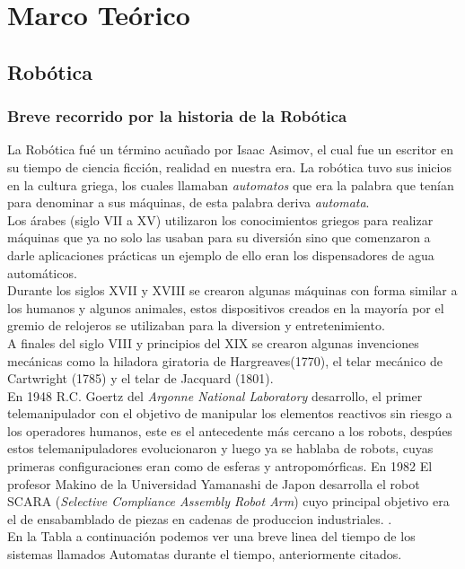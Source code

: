 
\chapter{Marco Te\'orico}
\section{Rob\'otica}
\subsection{Breve recorrido por la historia de la Rob\'otica}
La Rob\'otica fu\'e un t\'ermino acu\~nado por Isaac Asimov, el cual fue un escritor en su tiempo de ciencia ficci\'on, realidad en nuestra era. La rob\'otica tuvo sus inicios en la cultura griega, los cuales llamaban \emph{automatos} que era la palabra que ten\'ian para denominar a sus m\'aquinas, de esta palabra deriva \emph{automata}.\\
Los \'arabes (siglo VII a XV) utilizaron los conocimientos griegos para realizar m\'aquinas que ya no solo las usaban para su diversi\'on sino que comenzaron a darle aplicaciones pr\'acticas un ejemplo de ello eran los dispensadores de agua autom\'aticos. \\
Durante los siglos XVII y XVIII  se crearon algunas m\'aquinas con forma similar a los humanos y algunos animales, estos dispositivos creados en la mayor\'ia por el gremio de relojeros se utilizaban para la diversion y entretenimiento. \\
A finales del siglo VIII y principios del XIX se crearon algunas invenciones mec\'anicas como la hiladora giratoria de Hargreaves(1770), el telar mec\'anico de Cartwright (1785) y el telar de Jacquard (1801).\\
En 1948 R.C. Goertz del \emph{Argonne National Laboratory} desarrollo, el primer telemanipulador con el objetivo de manipular los elementos reactivos sin riesgo a los operadores humanos, este es el antecedente m\'as cercano a los robots, desp\'ues estos telemanipuladores evolucionaron y luego ya se hablaba de robots, cuyas primeras configuraciones eran como de esferas y antropom\'orficas. En 1982 El profesor Makino de la Universidad Yamanashi de Japon desarrolla el robot SCARA (\emph{Selective Compliance Assembly Robot Arm}) cuyo principal objetivo era el de ensabamblado de piezas en cadenas de produccion industriales. \cite{lib_rob1}.\\
En la Tabla a continuaci\'on podemos ver una breve linea del tiempo de los sistemas llamados Automatas durante el tiempo, anteriormente citados.\\\\


